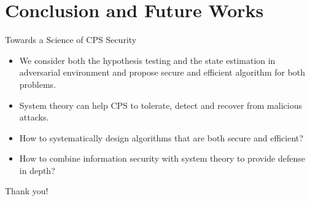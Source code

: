 \documentclass[10pt]{beamer}
\begin{document}
%

\section{Conclusion and Future Works}

\begin{frame}{Towards a Science of CPS Security}
  \begin{itemize}
  \item We consider both the hypothesis testing and the state estimation in adversarial environment and propose secure and efficient algorithm for both problems.
  \item System theory can help CPS to tolerate, detect and recover from malicious attacks.
  \item How to systematically design algorithms that are both secure and efficient?
  \item How to combine information security with system theory to provide defense in depth?
  \end{itemize}
\end{frame}

\begin{frame}[standout]
  Thank you!
\end{frame}
\end{document}
